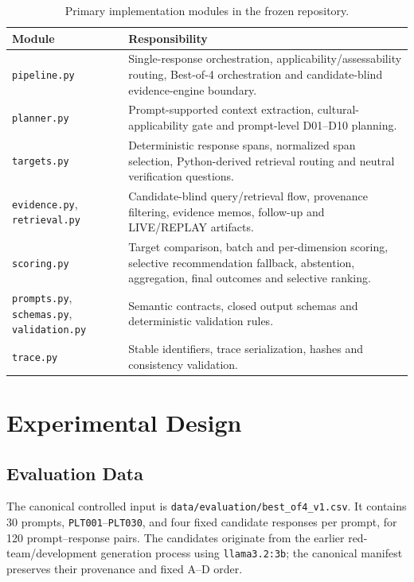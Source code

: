 \begin{table}[htbp]
\centering
\footnotesize
\caption{Primary implementation modules in the frozen repository.}
\label{tab:implementation-modules}
\begin{tabularx}{\textwidth}{p{4.0cm}X}
\toprule
\textbf{Module} & \textbf{Responsibility} \\
\midrule
\texttt{pipeline.py} & Single-response orchestration, applicability/assessability routing, Best-of-4 orchestration and candidate-blind evidence-engine boundary. \\
\texttt{planner.py} & Prompt-supported context extraction, cultural-applicability gate and prompt-level D01--D10 planning. \\
\texttt{targets.py} & Deterministic response spans, normalized span selection, Python-derived retrieval routing and neutral verification questions. \\
\texttt{evidence.py}, \texttt{retrieval.py} & Candidate-blind query/retrieval flow, provenance filtering, evidence memos, follow-up and LIVE/REPLAY artifacts. \\
\texttt{scoring.py} & Target comparison, batch and per-dimension scoring, selective recommendation fallback, abstention, aggregation, final outcomes and selective ranking. \\
\texttt{prompts.py}, \texttt{schemas.py}, \texttt{validation.py} & Semantic contracts, closed output schemas and deterministic validation rules. \\
\texttt{trace.py} & Stable identifiers, trace serialization, hashes and consistency validation. \\
\bottomrule
\end{tabularx}
\end{table}

\section{Experimental Design}

\subsection{Evaluation Data}
The canonical controlled input is \texttt{data/evaluation/best\_of4\_v1.csv}. It contains 30 prompts, \texttt{PLT001}--\texttt{PLT030}, and four fixed candidate responses per prompt, for 120 prompt--response pairs. The candidates originate from the earlier red-team/development generation process using \texttt{llama3.2:3b}; the canonical manifest preserves their provenance and fixed A--D order.

